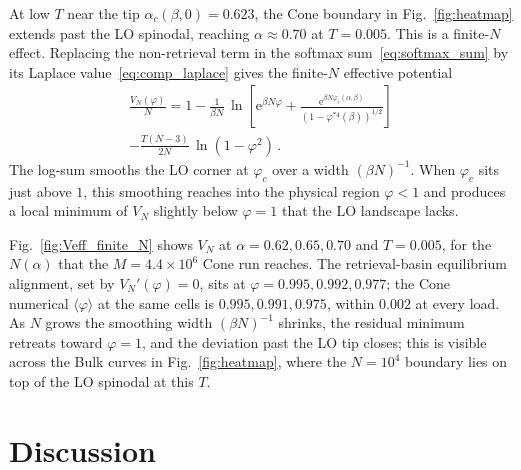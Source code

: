 \documentclass[letterpaper]{article} %
\newcommand{\e}{{\mathrm{e}}}
\newcommand{\Bnet}{\beta}
\newcommand{\ac}{\alpha_c}
\begin{document}
At low $T$ near the tip $\ac(\Bnet, 0) = 0.623$, the Cone boundary in Fig.~\ref{fig:heatmap} extends past the LO spinodal, reaching $\alpha \approx 0.70$ at $T = 0.005$. This is a finite-$N$ effect. Replacing the non-retrieval term in the softmax sum~\eqref{eq:softmax_sum} by its Laplace value~\eqref{eq:comp_laplace} gives the finite-$N$ effective potential
\begin{multline}
\frac{V_N(\varphi)}{N} = 1 - \frac{1}{\Bnet N}\,
   \ln\!\left[\e^{\Bnet N \varphi} +
            \frac{\e^{\Bnet N \varphi_c(\alpha, \Bnet)}}{(1-\varphi^{*4}(\Bnet))^{1/2}} \right] \\
    - \frac{T(N-3)}{2N}\,\ln(1 - \varphi^{2})\,.
\label{eq:V-finite-N}
\end{multline}
The log-sum smooths the LO corner at $\varphi_c$ over a width $(\Bnet N)^{-1}$. When $\varphi_c$ sits just above $1$, this smoothing reaches into the physical region $\varphi < 1$ and produces a local minimum of $V_N$ slightly below $\varphi = 1$ that the LO landscape lacks.

Fig.~\ref{fig:Veff_finite_N} shows $V_N$ at $\alpha = 0.62, 0.65, 0.70$ and $T = 0.005$, for the $N(\alpha)$ that the $M = 4.4 \times 10^6$ Cone run reaches. The retrieval-basin equilibrium alignment, set by $V_N'(\varphi) = 0$, sits at $\varphi = 0.995, 0.992, 0.977$; the Cone numerical $\langle\varphi\rangle$ at the same cells is $0.995, 0.991, 0.975$, within $0.002$ at every load. As $N$ grows the smoothing width $(\Bnet N)^{-1}$ shrinks, the residual minimum retreats toward $\varphi = 1$, and the deviation past the LO tip closes; this is visible across the Bulk curves in Fig.~\ref{fig:heatmap}, where the $N = 10^4$ boundary lies on top of the LO spinodal at this $T$.








\section{Discussion}
\label{sec:discussion}
\end{document}
